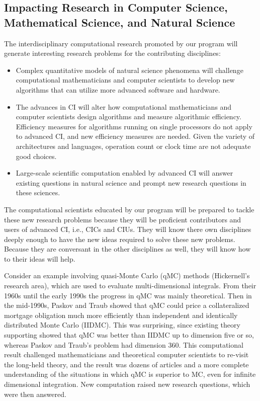 \documentclass[11pt]{NSFamsart}
\begin{document}
\subsection{Impacting Research in Computer Science, Mathematical Science, and Natural Science}
The interdisciplinary computational research promoted by our program will generate interesting research problems for the contributing disciplines:
\begin{itemize}
\item Complex quantitative models of natural science phenomena will challenge computational mathematicians and computer scientists to develop new algorithms that can utilize more advanced software and hardware.  
\item The advances in CI will alter how computational mathematicians and computer scientists design algorithms and measure algorithmic efficiency.  Efficiency measures for algorithms running on single processors do not apply to advanced CI, and new efficiency measures are needed.  Given the variety of architectures and languages, operation count or  clock time are not adequate good choices.
\item Large-scale scientific computation enabled by advanced CI will answer existing questions in natural science and prompt new research questions in these sciences.  
\end{itemize}
The computational scientists educated by our program will be prepared to tackle these new research problems because they will be proficient contributors and users of advanced CI, i.e., CICs and CIUs.  They will know there own disciplines deeply enough to have the new ideas required to solve these new problems.  Because they are conversant in the other disciplines as well, they will know how to their ideas will help.

Consider an example involving quasi-Monte Carlo (qMC) methods (Hickernell's research area), which are used to evaluate multi-dimensional integrals. From their 1960s until the early 1990s the progress in qMC was mainly theoretical.  Then in the mid-1990s, Paskov and Traub \cite{PasTra95} showed that qMC could price a collateralized mortgage obligation much more efficiently than independent and identically distributed Monte Carlo (IIDMC).  This was surprising, since existing theory supporting showed that qMC was better than IIDMC up to dimension five or so, whereas Paskov and Traub's problem had dimension 360.  This computational result challenged mathematicians and theoretical computer scientists to re-visit the long-held theory, and the result was dozens of articles and a more complete understanding of the situations in which qMC is superior to MC, even for infinite dimensional integration.  New computation raised new research questions, which  were then answered.
\end{document}

